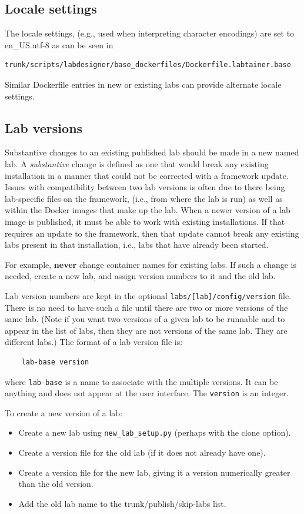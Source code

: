 \documentclass[12pt]{article}
\begin{document}
\subsection{Locale settings}
The locale settings, (e.g., used when interpreting character encodings) are set to en\_US.utf-8 
as can be seen in 
\begin{verbatim}
trunk/scripts/labdesigner/base_dockerfiles/Dockerfile.labtainer.base
\end{verbatim}
Similar Dockerfile entries in new or existing labs can provide alternate locale settings.

\subsection{Lab versions}
Substantive changes to an existing published lab should be made in
a new named lab.  A \textit{substantive} change is defined as one that would
break any existing installation in a manner that could not be corrected
with a framework update.  Issues with compatibility between two
lab versions is often due to there being lab-specific files on the framework,
(i.e., from where the lab is run) as well as within the Docker images that
make up the lab.  When a newer version of a lab image is published, it must 
be able to work with existing installations.  If that requires an update to the
framework, then that update cannot break any existing labs present in that
installation, i.e., labs that have already been started.

For example, \textbf{never} change container names for existing labs.  If such
a change is needed, create a new lab, and assign version numbers to
it and the old lab.  

Lab version numbers are kept in the optional {\tt labs/[lab]/config/version} file.
There is no need to have such a file until there are two or more versions of the
same lab.  (Note if you want two versions of a given lab to be runnable and to appear
in the list of labs, then they are not versions of the same lab.  They are different
labs.)  The format of a lab version file is:
\begin{verbatim}
    lab-base version
\end{verbatim}
where {\tt lab-base} is a name to associate with the multiple versions.  It can be
anything and does not appear at the user interface.  The {\tt version} is an integer.

To create a new version of a lab:
\begin{itemize}
\item Create a new lab using {\tt new\_lab\_setup.py} (perhaps with the clone option).
\item Create a version file for the old lab (if it does not already have one). 
\item Create a version file for the new lab, giving it a version numerically greater than
the old version.
\item Add the old lab name to the trunk/publish/skip-labs list.
\end{itemize}
\end{document}
